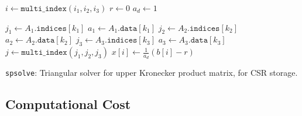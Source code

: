 \begin{algorithm}[ht]
\DontPrintSemicolon
\SetAlgoLined
{}
\BlankLine

   {
     {
       {
        $i \gets \texttt{multi\_index}(i_1, i_2, i_3)$ \; 
        $r \gets 0$ \; 
        $a_d \gets 1$ \; 

         {
          $j_1 \gets A_1.\texttt{indices}[k_1]$ \; 
          $a_1 \gets A_1.\texttt{data}[k_1]$ \; 
           {
            $j_2 \gets A_2.\texttt{indices}[k_2]$ \; 
            $a_2 \gets A_2.\texttt{data}[k_2]$ \; 
             {
              $j_3 \gets A_3.\texttt{indices}[k_3]$ \; 
              $a_3 \gets A_3.\texttt{data}[k_3]$ \; 
              $j \gets \texttt{multi\_index}(j_1, j_2, j_3)$ \; 
            }
          }
        }
        $x[i] \gets \frac{1}{a_d}(b[i] - r)$ \; 
      }
    }
  }

\caption{\texttt{spsolve}: Triangular solver for upper Kronecker product matrix, for CSR storage.}
\end{algorithm} 

\subsection{Computational Cost}
